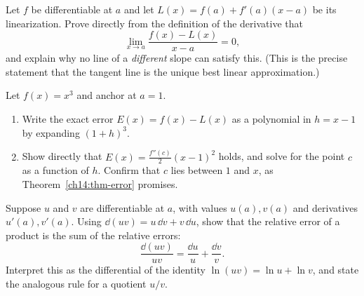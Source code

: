 \begin{exercise}
Let $f$ be differentiable at $a$ and let $L(x) = f(a)+f'(a)(x-a)$ be its
linearization. Prove directly from the definition of the derivative that
\[
\lim_{x\to a} \frac{f(x)-L(x)}{x-a} = 0,
\]
and explain why no line of a \emph{different} slope can satisfy this. (This is the
precise statement that the tangent line is the unique best linear approximation.)
\end{exercise}

\begin{exercise}
Let $f(x) = x^3$ and anchor at $a=1$.
\begin{enumerate}
\item Write the exact error $E(x) = f(x) - L(x)$ as a polynomial in $h=x-1$ by
expanding $(1+h)^3$.
\item Show directly that $E(x) = \tfrac{f''(c)}{2}(x-1)^2$ holds, and solve for
the point $c$ as a function of $h$. Confirm that $c$ lies between $1$ and $x$, as
Theorem~\ref{ch14:thm-error} promises.
\end{enumerate}
\end{exercise}

\begin{exercise}
Suppose $u$ and $v$ are differentiable at $a$, with values $u(a), v(a)$ and
derivatives $u'(a), v'(a)$. Using $\dd(uv) = u\,\dd v + v\,\dd u$, show that the
relative error of a product is the sum of the relative errors:
\[
\frac{\dd(uv)}{uv} = \frac{\dd u}{u} + \frac{\dd v}{v}.
\]
Interpret this as the differential of the identity $\ln(uv) = \ln u + \ln v$, and
state the analogous rule for a quotient $u/v$.
\end{exercise}
